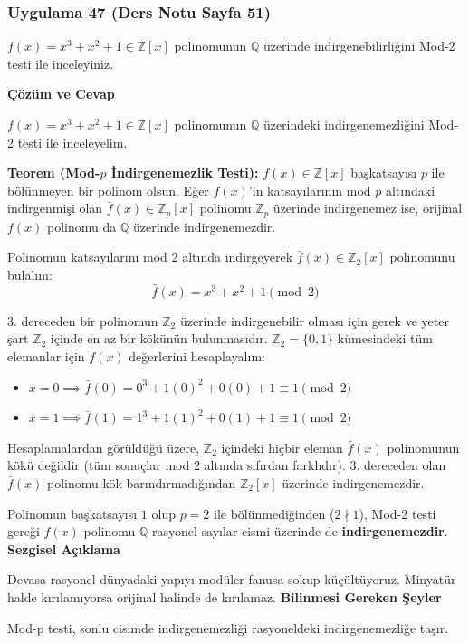 \documentclass[11pt, a4paper]{article}
\newenvironment{cozum}{
    \vspace{0.5cm}
    \noindent\textcolor{green!60!black}{\faCheckCircle\enspace \textbf{\Large Çözüm ve Cevap}}\par\vspace{0.2cm}
}{}
\newenvironment{sezgisel}{
    \vspace{0.5cm}
    \noindent\textcolor{orange!80!black}{\faLightbulb\enspace \textbf{\Large Sezgisel Açıklama}}\par\vspace{0.2cm}
    \itshape
}{}
\newenvironment{bilgi}{
    \vspace{0.5cm}
    \noindent\textcolor{red!70!black}{\faExclamationTriangle\enspace \textbf{\Large Bilinmesi Gereken Şeyler}}\par\vspace{0.2cm}
}{}
\begin{document}
\newpage
\subsubsection{Uygulama 47 (Ders Notu Sayfa 51)}
\begin{sorubox}
$f(x)=x^3+x^2+1 \in \mathbb{Z}[x]$ polinomunun $\mathbb{Q}$ üzerinde indirgenebilirliğini Mod-2 testi ile inceleyiniz.
\end{sorubox}
\begin{cozum}
$f(x) = x^{3} + x^{2} + 1 \in \mathbb{Z}[x]$ polinomunun $\mathbb{Q}$ üzerindeki indirgenemezliğini Mod-2 testi ile inceleyelim.

\textbf{Teorem (Mod-$p$ İndirgenemezlik Testi):} $f(x) \in \mathbb{Z}[x]$ başkatsayısı $p$ ile bölünmeyen bir polinom olsun. Eğer $f(x)$'in katsayılarının mod $p$ altındaki indirgenmişi olan $\bar{f}(x) \in \mathbb{Z}_p[x]$ polinomu $\mathbb{Z}_p$ üzerinde indirgenemez ise, orijinal $f(x)$ polinomu da $\mathbb{Q}$ üzerinde indirgenemezdir.

Polinomun katsayılarını mod 2 altında indirgeyerek $\bar{f}(x) \in \mathbb{Z}_{2}[x]$ polinomunu bulalım:
\[ \bar{f}(x) = x^{3} + x^{2} + 1 \pmod{2} \]

3. dereceden bir polinomun $\mathbb{Z}_{2}$ üzerinde indirgenebilir olması için gerek ve yeter şart $\mathbb{Z}_{2}$ içinde en az bir kökünün bulunmasıdır. $\mathbb{Z}_{2} = \{0, 1\}$ kümesindeki tüm elemanlar için $\bar{f}(x)$ değerlerini hesaplayalım:
\begin{itemize}
    \item $x = 0 \implies \bar{f}(0) = 0^3 + 1(0)^2 + 0(0) + 1 \equiv 1 \pmod{2}$
    \item $x = 1 \implies \bar{f}(1) = 1^3 + 1(1)^2 + 0(1) + 1 \equiv 1 \pmod{2}$
\end{itemize}

Hesaplamalardan görüldüğü üzere, $\mathbb{Z}_{2}$ içindeki hiçbir eleman $\bar{f}(x)$ polinomunun kökü değildir (tüm sonuçlar mod 2 altında sıfırdan farklıdır). 3. dereceden olan $\bar{f}(x)$ polinomu kök barındırmadığından $\mathbb{Z}_{2}[x]$ üzerinde indirgenemezdir.

Polinomun başkatsayısı $1$ olup $p = 2$ ile bölünmediğinden ($2 \nmid 1$), Mod-2 testi gereği $f(x)$ polinomu $\mathbb{Q}$ rasyonel sayılar cismi üzerinde de \textbf{indirgenemezdir}.
\end{cozum}
\begin{sezgisel}
Devasa rasyonel dünyadaki yapıyı modüler fanusa sokup küçültüyoruz. Minyatür halde kırılamıyorsa orijinal halinde de kırılamaz.
\end{sezgisel}
\begin{bilgi}
Mod-p testi, sonlu cisimde indirgenemezliği rasyoneldeki indirgenemezliğe taşır.
\end{bilgi}
\end{document}
